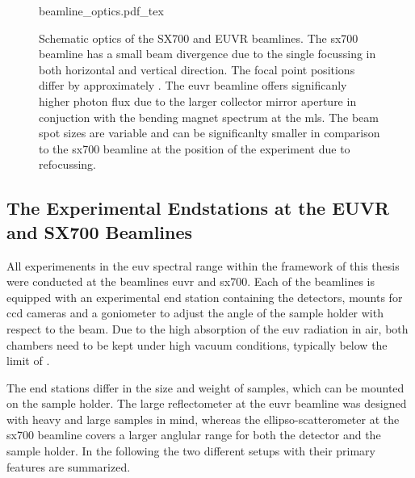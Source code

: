\begin{figure}[htb]
    \def\svgwidth{\textwidth}
    {beamline_optics.pdf_tex}
    \caption[Schematic optics of the SX700 and EUVR beamlines.]{Schematic optics of the SX700 and EUVR beamlines. The \gls{sx700} beamline has a small beam divergence due to the single focussing in both horizontal and vertical direction. The focal point positions differ by approximately . The \gls{euvr} beamline offers significanly higher photon flux due to the larger collector mirror aperture in conjuction with the bending magnet spectrum at the \gls{mls}. The beam spot sizes are variable and can be significanlty smaller in comparison to the \gls{sx700} beamline at the position of the experiment due to refocussing.}
    \label{ch_exp:beamline_optics}
\end{figure}

\subsection{The Experimental Endstations at the EUVR and SX700 Beamlines}
All experimenents in the \gls{euv} spectral range within the framework of this thesis were conducted at the beamlines \acrshort{euvr} and \acrshort{sx700}. Each of the beamlines is equipped with an experimental end station containing the detectors, mounts for \gls{ccd} cameras and a goniometer to adjust the angle of the sample holder with respect to the beam. Due to the high absorption of the \gls{euv} radiation in air, both chambers need to be kept under high vacuum conditions, typically below the limit of .

The end stations differ in the size and weight of samples, which can be mounted on the sample holder. The large reflectometer at the \gls{euvr} beamline was designed with heavy and large samples in mind, whereas the ellipso-scatterometer at the \gls{sx700} beamline covers a larger anglular range for both the detector and the sample holder. In the following the two different setups with their primary features are summarized. 

